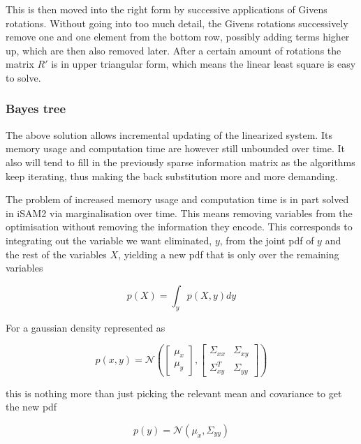 This is then moved into the right form by successive applications of Givens rotations\cite{GivensRot}. Without going into too much detail, the Givens rotations successively remove one and one element from the bottom row, possibly adding terms higher up, which are then also removed later. After a certain amount of rotations the matrix $R'$ is in upper triangular form, which means the linear least square is easy to solve.

\subsubsection{Bayes tree}

The above solution allows incremental updating of the linearized system. Its memory usage and computation time are however still unbounded over time. It also will tend to fill in the previously sparse information matrix as the algorithms keep iterating, thus making the back substitution more and more demanding.

The problem of increased memory usage and computation time is in part solved in iSAM2 via marginalisation over time. This means removing variables from the optimisation without removing the information they encode. This corresponds to integrating out the variable we want eliminated, $y$, from the joint pdf of $y$ and the rest of the variables $X$, yielding a new pdf that is only over the remaining variables

\begin{equation}
    p(X) = \int_yp(X,y)dy
\end{equation}

For a gaussian density represented as 

\begin{equation}
    p(x,y) = \mathcal{N}(\begin{bmatrix}\mu_x \\ \mu_y \end{bmatrix}, \begin{bmatrix} \Sigma_{xx} & \Sigma_{xy} \\ \Sigma_{xy}^T & \Sigma_{yy} \end{bmatrix}) 
\end{equation}

this is nothing more than just picking the relevant mean and covariance to get the new pdf

\begin{equation}
    p(y) = \mathcal{N}(\mu_x,\Sigma_{yy})
\end{equation}

